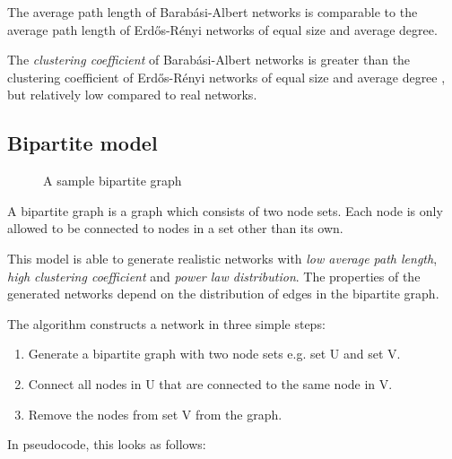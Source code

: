 \documentclass[a4paper,11pt,titlepage]{article}
\begin{document}

The average path length of Barab\'{a}si-Albert networks is comparable to the
average path length of Erd\H{o}s-R\'{e}nyi networks of equal size and average
degree.

The \emph{clustering coefficient} of Barab\'{a}si-Albert networks is greater
than the clustering coefficient of Erd\H{o}s-R\'{e}nyi networks of equal size
and average degree \cite{oconn11}, but relatively low compared to real networks.


\subsection{Bipartite model}

\begin{figure}[ht!]
  \centering
  
  \caption{A sample bipartite graph}
\end{figure}

A bipartite graph is a graph which consists of two node sets. Each node
is only allowed to be connected to nodes in a set other than its own.

This model is able to generate realistic networks with
\emph{low average path length}, \emph{high clustering coefficient} and
\emph{power law distribution}. The properties of the generated networks
depend on the distribution of edges in the bipartite graph.

The algorithm constructs a network in three simple steps:

\begin{enumerate}
  \item Generate a bipartite graph with two node sets e.g. set U and set V.
  \item Connect all nodes in U that are connected to the same node in V.
  \item Remove the nodes from set V from the graph.
\end{enumerate}

In pseudocode, this looks as follows:
\end{document}
